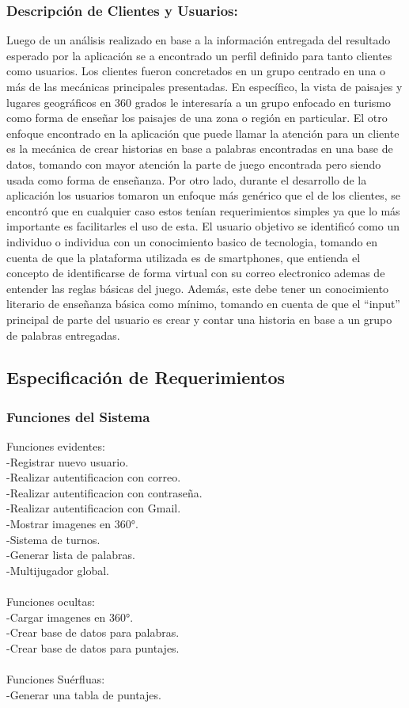 \subsubsection{Descripción de Clientes y Usuarios:}
Luego de un análisis realizado en base a la información entregada del resultado esperado por la aplicación se a encontrado un perfil definido para tanto clientes como usuarios.
Los clientes fueron concretados en un grupo centrado en una o más de las mecánicas principales presentadas. En específico, la vista de paisajes y lugares geográficos en 360 grados le interesaría a un grupo enfocado en turismo como forma de enseñar los paisajes de una zona o región en particular. El otro enfoque encontrado en la aplicación que puede llamar la atención para un cliente es la mecánica de crear historias en base a palabras encontradas en una base de datos, tomando con mayor atención la parte de juego encontrada pero siendo usada como forma de enseñanza.
Por otro lado, durante el desarrollo de la aplicación los usuarios tomaron un enfoque más genérico que el de los clientes, se encontró que en cualquier caso estos tenían requerimientos  simples ya que lo más importante es facilitarles el uso de esta. El usuario objetivo se identificó como un individuo o individua con un conocimiento basico de tecnologia, tomando en cuenta de que la plataforma utilizada es de smartphones, que entienda el concepto de identificarse de forma virtual con su correo electronico ademas de entender las reglas básicas del juego. Además, este debe tener un conocimiento literario de enseñanza básica como mínimo, tomando en cuenta de que el “input” principal de parte del usuario es crear y contar una historia en base a un grupo de palabras entregadas.
\subsection{Especificación de Requerimientos}
\subsubsection{Funciones del Sistema}
Funciones evidentes:
\\	-Registrar nuevo usuario.
\\	-Realizar autentificacion con correo.
\\	-Realizar autentificacion con contraseña.
\\	-Realizar autentificacion con Gmail.
\\	-Mostrar imagenes en 360°.
\\	-Sistema de turnos.
\\	-Generar lista de palabras.
\\	-Multijugador global.\\\\
Funciones ocultas:
\\	-Cargar imagenes en 360°.
\\	-Crear base de datos para palabras.
\\	-Crear base de datos para puntajes.\\\\
Funciones Suérfluas:
\\	-Generar una tabla de puntajes.
